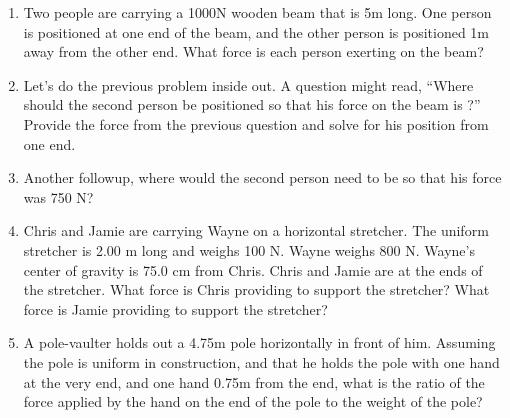 \begin{enumerate}
	\item
	Two people are carrying a 1000N wooden beam that is 5m long. One person is positioned at one end of the beam, and the other person is positioned 1m away from the other end. What force is each person exerting on the beam?\hugeskip
	
	\item 
	Let's do the previous problem inside out. A question might read, ``Where should the second person be positioned so that his force on the beam is \blank?'' Provide the force from the previous question and solve for his position from one end.
	
	\item 
	Another followup, where would the second person need to be so that his force was 750 N?\hugeskip
	
	\item
	Chris and Jamie are carrying Wayne on a horizontal stretcher. The uniform stretcher is 2.00 m long and weighs 100 N. Wayne weighs 800 N. Wayne's center of gravity is 75.0 cm from Chris. Chris and Jamie are at the ends of the stretcher. What force is Chris providing to support the stretcher? What force is Jamie providing to support the stretcher?\hugeskip
	
	\item
	A pole-vaulter holds out a 4.75m pole horizontally in front of him. Assuming the pole is uniform in construction, and that he holds the pole with one hand at the very end, and one hand 0.75m from the end, what is the ratio of the force applied by the hand on the end of the pole to the weight of the pole?\hugeskip
	


\end{enumerate}
